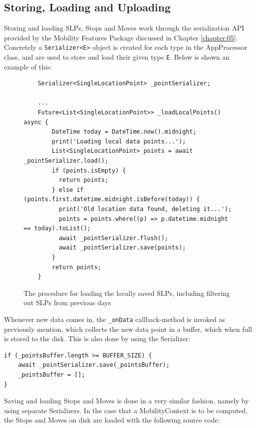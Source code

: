 \subsection{Storing, Loading and Uploading}
Storing and loading SLPs, Stops and Moves work through the serialization API provided by the Mobility Features Package discussed in Chapter \ref{chapter:05}. Concretely a \verb|Serializer<E>| object is created for each type in the AppProcessor class, and are used to store and load their given type \verb|E|. Below is shown an example of this:



\begin{figure}
    \centering
    \begin{verbatim}
    Serializer<SingleLocationPoint> _pointSerializer;
    
    ...
    Future<List<SingleLocationPoint>> _loadLocalPoints() async {
        DateTime today = DateTime.now().midnight;
        print('Loading local data points...');
        List<SingleLocationPoint> points = await _pointSerializer.load();
        if (points.isEmpty) {
          return points;
        } else if (points.first.datetime.midnight.isBefore(today)) {
          print('Old location data found, deleting it...');
          points = points.where((p) => p.datetime.midnight == today).toList();
          await _pointSerializer.flush();
          await _pointSerializer.save(points);
        }
        return points;
    }
    \end{verbatim}
    \caption{The procedure for loading the locally saved SLPs, including filtering out SLPs from previous days}
    \label{fig:points-serialization}
\end{figure}


Whenever new data comes in, the \verb|_onData| callback-method is invoked as previously mention, which collects the new data point in a buffer, which when full is stored to the disk. This is also done by using the Serializer:

\begin{verbatim}
if (_pointsBuffer.length >= BUFFER_SIZE) {
    await _pointSerializer.save(_pointsBuffer);
    _pointsBuffer = [];
}
\end{verbatim}


Saving and loading Stops and Moves is done in a very similar fashion, namely by using separate Serializers. In the case that a MobilityContext is to be computed, the Stops and Moves on disk are loaded with the following source code:

